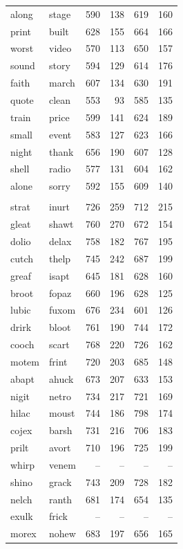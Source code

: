 \documentclass[
]{interact}
\begin{document}
\begin{longtable*}{llrrrr}
along & stage & 590 & 138 & 619 & 160 \\ 
print & built & 628 & 155 & 664 & 166 \\ 
worst & video & 570 & 113 & 650 & 157 \\ 
sound & story & 594 & 129 & 614 & 176 \\ 
faith & march & 607 & 134 & 630 & 191 \\ 
quote & clean & 553 & 93 & 585 & 135 \\ 
train & price & 599 & 141 & 624 & 189 \\ 
small & event & 583 & 127 & 623 & 166 \\ 
night & thank & 656 & 190 & 607 & 128 \\ 
shell & radio & 577 & 131 & 604 & 162 \\ 
alone & sorry & 592 & 155 & 609 & 140 \\ 
\midrule\addlinespace[2.5pt]
 \\ 
\midrule\addlinespace[2.5pt]
strat & inurt & 726 & 259 & 712 & 215 \\ 
gleat & shawt & 760 & 270 & 672 & 154 \\ 
dolio & delax & 758 & 182 & 767 & 195 \\ 
cutch & thelp & 745 & 242 & 687 & 199 \\ 
greaf & isapt & 645 & 181 & 628 & 160 \\ 
broot & fopaz & 660 & 196 & 628 & 125 \\ 
lubic & fuxom & 676 & 234 & 601 & 126 \\ 
drirk & bloot & 761 & 190 & 744 & 172 \\ 
cooch & scart & 768 & 220 & 726 & 162 \\ 
motem & frint & 720 & 203 & 685 & 148 \\ 
abapt & ahuck & 673 & 207 & 633 & 153 \\ 
nigit & netro & 734 & 217 & 721 & 169 \\ 
hilac & moust & 744 & 186 & 798 & 174 \\ 
cojex & barsh & 731 & 216 & 706 & 183 \\ 
prilt & avort & 710 & 196 & 725 & 199 \\ 
whirp & venem & – & – & – & – \\ 
shino & grack & 743 & 209 & 728 & 182 \\ 
nelch & ranth & 681 & 174 & 654 & 135 \\ 
exulk & frick & – & – & – & – \\ 
morex & nohew & 683 & 197 & 656 & 165 \\ 

\end{longtable*}
\end{document}

